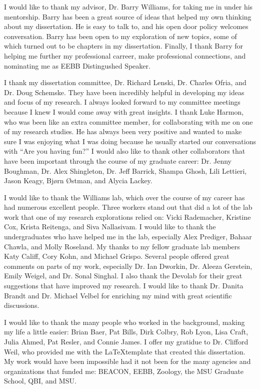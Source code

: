\begin{acknowledgment}

I would like to thank my advisor, Dr. Barry Williams,
for taking me in under his mentorship.
%
Barry has been a great source of ideas
that helped my own thinking about my dissertation.
%
He is easy to talk to,
and his open door policy welcomes conversation.
%
Barry has been open to my exploration of new topics,
some of which turned out to be chapters in my dissertation.
%
Finally, I thank Barry for helping me further my professional carreer,
make professional connections, and nominating me as EEBB Distingushed Speaker.



I thank my dissertation committee,
Dr. Richard Lenski, Dr. Charles Ofria, and Dr. Doug Schemske.
%
They have been incredibly helpful
in developing my ideas and focus of my research.
%
I always looked forward to my committee meetings
because I knew I would come away with great insights.
%
I thank Luke Harmon, who was been like an extra committee member,
for collaborating with me on one of my research studies.
%
He has always been very positive and wanted to make sure
I was enjoying what I was doing because he usually started
our conversations with ``Are you having fun?''
%
I would also like to thank other collaborators that have
been important through the course of my graduate career:
Dr. Jenny Boughman, Dr. Alex Shingleton, Dr. Jeff Barrick,
Shampa Ghosh, Lili Lettieri, Jason Keagy, Bjørn Østman, and Alycia Lackey.



I would like to thank the Williams lab,
which over the course of my career has had numerous excellent people.
%
Three workers stand out that did a lot of the lab work
that one of my research explorations relied on:
Vicki Rademacher, Kristine Cox, Krista Reitenga, and Siva Nallasivam.
%
I would like to thank the undergraduates who have helped me in the lab,
especially Alex Prediger, Bahaar Chawla, and Molly Roseland.
%
My thanks to my fellow graduate lab members
Katy Califf, Cory Kohn, and Michael Grispo.
%
Several people offered great comments on parts of my work, especially
Dr. Ian Dworkin, Dr. Aleeza Gerstein, Emily Weigel, and Dr. Sonal Singhal.
%
I also thank the Devolab for their great suggestions
that have improved my research.
%
I would like to thank Dr. Danita Brandt and Dr. Michael Velbel
for enriching my mind with great scientific discussions.



I would like to thank the many people who worked in the background,
making my life a little easier:
Brian Baer, Pat Bills, Dirk Colbry, Rob Lyon, Lisa Craft, Julia Ahmed,
Pat Resler, and Connie James.
%
I offer my gratidue to Dr. Clifford Weil, who provided me
with the \LaTeX template that created this dissertation.
%
My work would have been impossible had it not been
for the many agencies and organizations that funded me:
BEACON, EEBB, Zoology, the MSU Graduate School, QBI, and MSU.




\end{acknowledgment}
